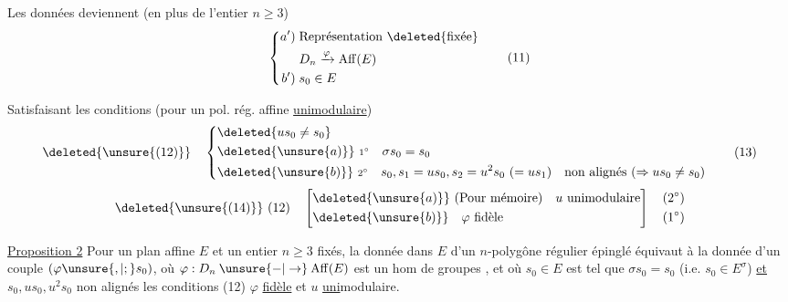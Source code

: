 Les données deviennent (en plus de l'entier $n\geq3$)
\[
\left\{\begin{aligned}
 a')\;&\text{Représentation \deleted{fixée}}\\
 &D_n\xrightarrow{\varphi}\mathrm{Aff}(E)\\
 b')\;&s_0\in E
\end{aligned}\right.\tag*{(11)}
\]

Satisfaisant les conditions (pour un pol. rég. affine \uline{unimodulaire})
\[
\deleted{\unsure{(12)}}\quad
\left\{\begin{aligned}
 &\deleted{u s_0\ne s_0}\\
 &\deleted{\unsure{a)}}\ {\scriptstyle 1^\circ}\quad\sigma s_0=s_0\\
 &\deleted{\unsure{b)}}\ {\scriptstyle 2^\circ}\quad s_0,s_1=u s_0,s_2=u^2s_0\ (=u s_1)\quad\text{non alignés}\ (\Rightarrow u s_0\ne s_0)
\end{aligned}\right.\tag*{(13)}
\]
\[
\deleted{\unsure{(14)}}\ (12)\quad
\left[\begin{aligned}
 &\deleted{\unsure{a)}}\ (\text{Pour mémoire})\quad u\text{ unimodulaire}\\
 &\deleted{\unsure{b)}}\quad \varphi\text{ fidèle}
\end{aligned}\right]\quad\begin{aligned}(2^\circ)\\(1^\circ)\end{aligned}
\]

\uline{Proposition 2} Pour un plan affine $E$  et un entier $n\geq3$ fixés, la donnée dans $E$ d'un $n$-polygône régulier  épinglé équivaut à la donnée d'un couple $(\varphi\unsure{,|;}s_0)$, où $\varphi:D_n\mathbin{\unsure{-|\to}}\mathrm{Aff}(E)$ est un hom de groupes , et où $s_0\in E$ est tel que $\sigma s_0=s_0$ (i.e. $s_0\in E^\sigma$) \uline{et} $s_0,us_0,u^2s_0$ non alignés   les conditions (12)  $\varphi$  \uline{fidèle} et \uline{$u$} \uline{uni}modulaire.

